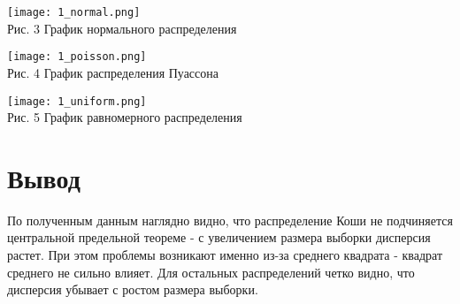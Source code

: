 \documentclass{article}
\begin{document}
\begin{center}
    \texttt{[image: 1\_normal.png]} \\
    Рис. 3 График нормального распределения
\end{center}

\begin{center}
    \texttt{[image: 1\_poisson.png]} \\
    Рис. 4 График распределения Пуассона
\end{center}

\begin{center}
    \texttt{[image: 1\_uniform.png]} \\
    Рис. 5 График равномерного распределения
\end{center}

\section{\Large Вывод}
По полученным данным наглядно видно, что распределение Коши не подчиняется центральной предельной теореме - с увеличением размера выборки дисперсия растет. При этом проблемы возникают именно из-за среднего квадрата - квадрат среднего не сильно влияет. Для остальных распределений четко видно, что дисперсия убывает с ростом размера выборки.
\end{document}
